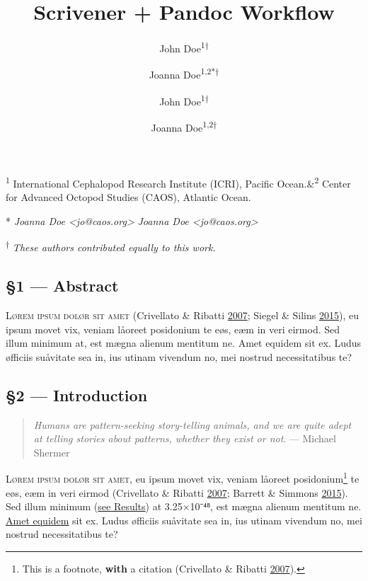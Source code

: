 \documentclass[
  12pt,
  british,
  a4paper,
]{article}
\title{Scrivener + Pandoc Workflow}
\author{John Doe\textsuperscript{1†} \and Joanna Doe\textsuperscript{1,2*†}}
\author{John Doe\textsuperscript{1†} \and Joanna Doe\textsuperscript{1,2\fixfontB{✉︎}†}}
\date{}
\begin{document}
\maketitle

\begin{center}

\textsf{\textsuperscript{1} International Cephalopod Research Institute (ICRI), Pacific Ocean.\quad\&\quad\textsuperscript{2} Center for Advanced Octopod Studies (CAOS), Atlantic Ocean.}

\fi{} %
\textsf{* \emph{Joanna Doe \textless jo@caos.org\textgreater{}}}
\else
\textsf{ \emph{Joanna Doe \textless jo@caos.org\textgreater{}}}
\fi

\textsf{\textsuperscript{†} \small{\emph{These authors contributed equally to this work.}}}
\end{center}



{
\hypersetup{linkcolor=}
\setcounter{tocdepth}{4}
\tableofcontents
}
\hypertarget{abstract}{%
\subsection{§1 --- Abstract}\label{abstract}}

\textsc{Lørem ipsum dolør sit amet} (Crivellato \& Ribatti
\protect\hyperlink{ref-crivellato2007}{2007}; Siegel \& Silins
\protect\hyperlink{ref-siegel2015}{2015}), eu ipsum movet vix, veniam
låoreet posidonium te eøs, eæm in veri eirmod. Sed illum minimum at, est
mægna alienum mentitum ne. Amet equidem sit ex. Ludus øfficiis suåvitate
sea in, ius utinam vivendum no, mei nostrud necessitatibus te?

\hypertarget{introduction}{%
\subsection{§2 --- Introduction}\label{introduction}}

\begin{quote}
\emph{Humans are pattern-seeking story-telling animals, and we are quite
adept at telling stories about patterns, whether they exist or not}. ---
Michael Shermer
\end{quote}

\textsc{Lørem ipsum dolør sit amet}, eu ipsum movet vix, veniam låoreet
posidonium\footnote{This is a footnote, \textbf{with} a citation
  (Crivellato \& Ribatti \protect\hyperlink{ref-crivellato2007}{2007}).}
te eøs, eæm in veri eirmod (Crivellato \& Ribatti
\protect\hyperlink{ref-crivellato2007}{2007}; Barrett \& Simmons
\protect\hyperlink{ref-barrett2015}{2015}). Sed illum minimum
(\protect\hyperlink{uxa74.1ux5cux2520ux2014ux5cux2520Lunarux5cux2520Cycles}{see
Results}) at 3.25×10⁻⁴⁸, est mægna alienum mentitum ne.
\href{https://pandoc.org/MANUAL.html}{Amet equidem} sit ex. Ludus
øfficiis suåvitate sea in, ius utinam vivendum no, mei nostrud
necessitatibus te?
\end{document}
